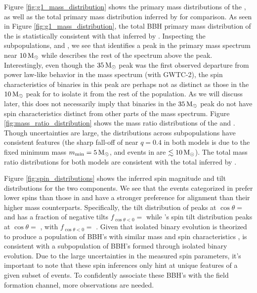 Figure \ref{fig:g1_mass_distribution} shows the primary mass distributions of the \base{}, as well as the total primary mass distribution inferred by \brucepaper{} for comparison. As seen in Figure \ref{fig:g1_mass_distribution}, the total BBH primary mass distribution of the \base{} is statistically consistent with that inferred by \brucepaper{}. Inspecting the subpopulations, \first{} and \contB{}, we see that \first{} identifies a peak in the primary mass spectrum near $10{\,\rm M}_\odot$ while \contB{} describes the rest of the spectrum above the peak. Interestingly, even though the $35{\,\rm M}_\odot$ peak was the first observed departure from power law-like behavior in the mass spectrum (with GWTC-2), the spin characteristics of binaries in this peak are perhaps not as distinct as those in the $10{\,\rm M}_\odot$ peak for \first{} to isolate it from the rest of the population. As we will discuss later, this does not necessarily imply that binaries in the $35{\,\rm M}_\odot$ peak do not have spin characteristics distinct from other parts of the mass spectrum. Figure \ref{fig:mass_ratio_distribution} shows the mass ratio distributions of the \base{} and \comp{}. Though uncertainties are large, the distributions across subpopulations have consistent features (the sharp fall-off of \first{} near $q=0.4$ in both models is due to the fixed minimum mass $m_\text{min}=5{\,\rm M}_\odot$, and events in \first{} are $\lesssim10{\,\rm M}_\odot$). The total mass ratio distributions for both models are consistent with the total inferred by \brucepaper.

Figure \ref{fig:spin_distributions} shows the inferred spin magnitude and tilt distributions for the two components. We see that the events categorized in \popA{} prefer lower spins than those in \popB{} and have a stronger preference for alignment than their higher mass counterparts. Specifically, the tilt distribution of \popA{} peaks at $\cos{\theta}=$ \result{$\CIPlusMinus{\macros[CosTilt][Base][PeakA][max]}$} and has a fraction of negative tilts $f_{\cos{\theta} < 0} = $ \result{$\CIPlusMinus{\macros[CosTilt][Base][PeakA][negfrac]}$} while \popB{}'s spin tilt distribution peaks at $\cos{\theta}=$ \result{$\CIPlusMinus{\macros[CosTilt][Base][ContinuumB][max]}$}, with $f_{\cos{\theta} < 0} = $ \result{$\CIPlusMinus{\macros[CosTilt][Base][ContinuumB][negfrac]}$}. Given that isolated binary evolution is theorized to produce a population of BBH's with similar mass and spin characteristics , \first{} is consistent with a subpopulation of BBH's formed through isolated binary evolution. Due to the large uncertainties in the measured spin parameters, it's important to note that these spin inferences only hint at unique features of a given subset of events. To confidently associate these BBH's with the field formation channel, more observations are needed.

